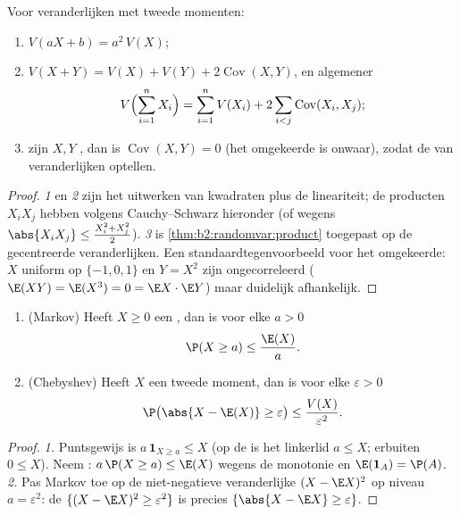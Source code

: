 \begin{theorem}\label{thm:b2:randomvar:variancerules}
Voor veranderlijken met tweede momenten:
\begin{enumerate}
\item $V(aX + b) = a^2\,V(X)$;
\item $V(X + Y) = V(X) + V(Y) + 2\operatorname{Cov}(X, Y)$, en
algemener
\[
V\Bigl(\sum_{i=1}^n X_i\Bigr)
= \sum_{i=1}^n V(X_i)
+ 2\sum_{i < j}\operatorname{Cov}(X_i, X_j) ;
\]
\item zijn $X, Y$ , dan is $\operatorname{Cov}(X, Y) =
0$ (het omgekeerde is onwaar), zodat de  van
 veranderlijken optellen.
\end{enumerate}
\end{theorem}

\begin{proof}
\emph{1} en \emph{2} zijn het uitwerken van kwadraten plus de
lineariteit; de producten $X_iX_j$ hebben 
volgens Cauchy--Schwarz hieronder (of wegens $\abs{X_iX_j} \leq
\frac{X_i^2 + X_j^2}{2}$). \emph{3} is
\cref{thm:b2:randomvar:product} toegepast op de gecentreerde
veranderlijken. Een standaardtegenvoorbeeld voor het omgekeerde:
$X$ uniform op $\{-1, 0, 1\}$ en $Y = X^2$ zijn ongecorreleerd
($\E(XY) = \E(X^3) = 0 = \E X \cdot \E Y$) maar duidelijk
afhankelijk.
\end{proof}

\begin{theorem}\label{thm:b2:randomvar:markov}
\leavevmode
\begin{enumerate}
\item (Markov) Heeft $X \geq 0$ een , dan is voor
elke $a > 0$
\[
\P(X \geq a) \leq \frac{\E(X)}{a} .
\]
\item (Chebyshev) Heeft $X$ een tweede moment, dan is voor elke
$\varepsilon > 0$
\[
\P\bigl(\abs{X - \E(X)} \geq \varepsilon\bigr)
\leq \frac{V(X)}{\varepsilon^2} .
\]
\end{enumerate}
\end{theorem}

\begin{proof}
\emph{1.} Puntsgewijs is $a\,\mathbf{1}_{X \geq a} \leq X$ (op de
 is het linkerlid $a \leq X$; erbuiten $0 \leq X$). Neem
: $a\,\P(X \geq a) \leq \E(X)$ wegens de
monotonie en $\E(\mathbf{1}_A) = \P(A)$.
\emph{2.} Pas Markov toe op de niet-negatieve veranderlijke $(X -
\E X)^2$ op niveau $a = \varepsilon^2$: de  $\{(X - \E
X)^2 \geq \varepsilon^2\}$ is precies $\{\abs{X - \E X} \geq
\varepsilon\}$.
\end{proof}

